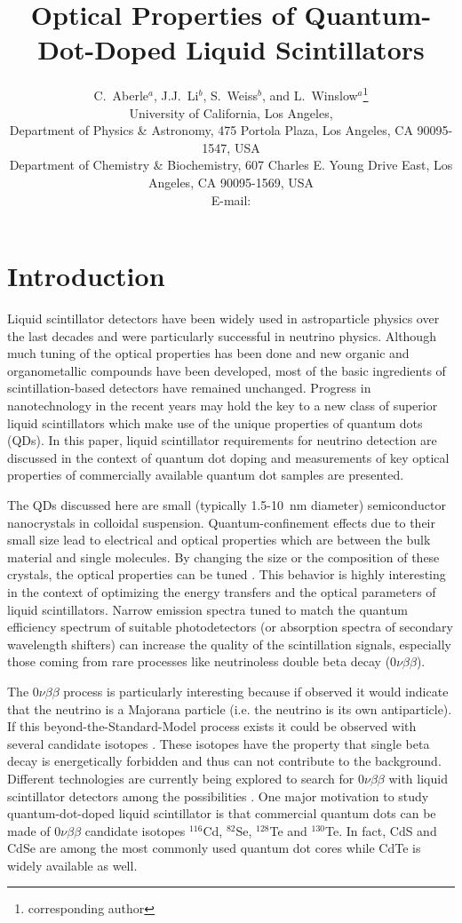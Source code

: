 \documentclass[cits]{JINST}
\title{Optical Properties of Quantum-Dot-Doped Liquid Scintillators}
\author{C.~Aberle$^a$, J.J.~Li$^b$, S.~Weiss$^b$, and L.~Winslow$^a$\setcounter{footnote}{0}\thanks{corresponding author}\\
University of California, Los Angeles,\\
\llap{$^a$}Department of Physics \& Astronomy, 475 Portola Plaza, Los Angeles, CA 90095-1547, USA\\
\llap{$^b$}Department of Chemistry \& Biochemistry, 607 Charles E. Young Drive East, Los Angeles, CA 90095-1569, USA\\
  E-mail: \email{lwinslow@physics.ucla.edu}}
\begin{document}
\section{Introduction}\label{intro}
Liquid scintillator detectors have been widely used in astroparticle physics over the last decades and were particularly successful in neutrino physics. Although much tuning of the optical properties has been done and new organic and organometallic compounds have been developed, most of the basic ingredients of scintillation-based detectors have remained unchanged. Progress in nanotechnology in the recent years may hold the key to a new class of superior liquid scintillators which make use of the unique properties of quantum dots (QDs). In this paper, liquid scintillator requirements for neutrino detection are discussed in the context of quantum dot doping and measurements of key optical properties of commercially available quantum dot samples are presented. 

The QDs discussed here are small (typically 1.5-10~nm diameter) semiconductor nanocrystals in colloidal suspension. Quantum-confinement effects due to their small size lead to electrical and optical properties which are between the bulk material and single molecules. By changing the size or the composition of these crystals, the optical properties can be tuned \cite{alivisatos1996,swafford2006}. This behavior is highly interesting in the context of optimizing the energy transfers and the optical parameters of liquid scintillators. Narrow emission spectra tuned to match the quantum efficiency spectrum of suitable photodetectors (or absorption spectra of secondary wavelength shifters) can increase the quality of the scintillation signals, especially those coming from rare processes like neutrinoless double beta decay (0$\nu\beta\beta$). 

The 0$\nu\beta\beta$ process is particularly interesting because if observed it would indicate that the neutrino is a Majorana particle (i.e. the neutrino is its own antiparticle). If this beyond-the-Standard-Model process exists it could be observed with several candidate isotopes \cite{vogel2002}. These isotopes have the property that single beta decay is energetically forbidden and thus can not contribute to the background. Different technologies are currently being explored to search for 0$\nu\beta\beta$ with liquid scintillator detectors among the possibilities \cite{kamlandzen,snoplus}. One major motivation to study quantum-dot-doped liquid scintillator is that commercial quantum dots can be made of 0$\nu\beta\beta$ candidate isotopes $^{116}$Cd, $^{82}$Se, $^{128}$Te and $^{130}$Te. In fact, CdS and CdSe are among the most commonly used quantum dot cores while CdTe is widely available as well.
\end{document}

